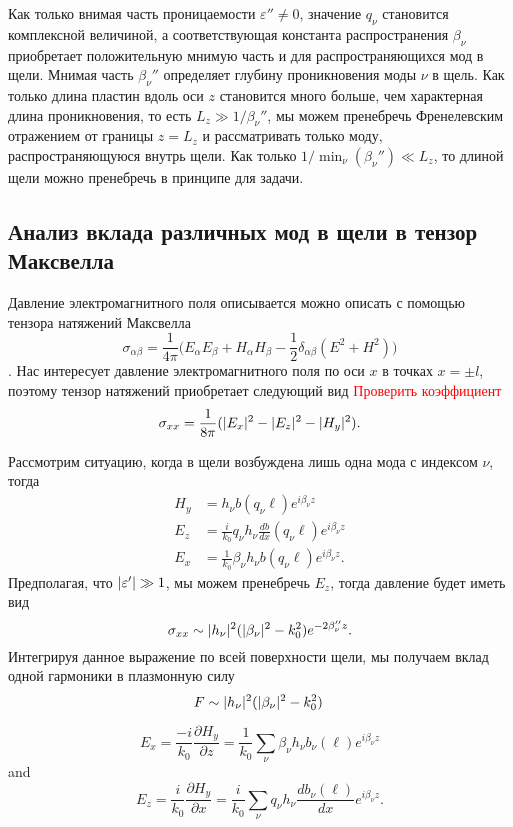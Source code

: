  Как только внимая часть проницаемости $\varepsilon'' \neq 0$, значение $q_\nu$ становится комплексной величиной, а соответствующая константа 
 распространения $\beta_\nu$ приобретает положительную мнимую часть и для распространяющихся мод в щели. Мнимая часть $\beta_\nu''$ определяет
 глубину проникновения моды $\nu$ в щель. Как только длина пластин вдоль оси $z$ становится много больше, чем характерная длина проникновения, то 
 есть $L_z \gg 1/\beta_\nu''$, мы можем пренебречь Френелевским отражением от границы $z = L_z$ и рассматривать только моду, распространяющуюся внутрь щели.  Как только $1/\min_{\nu}(\beta_\nu'') \ll L_z$,
 то длиной щели можно пренебречь в принципе для задачи. 

\subsection{Анализ вклада различных мод в щели в тензор Максвелла}

Давление электромагнитного поля описывается можно описать с помощью тензора натяжений Максвелла \begin{equation*}
    \sigma_{\alpha \beta} = \frac{1}{4 \pi}\Big( E_\alpha E_\beta + H_\alpha H_\beta - \frac{1}{2}\delta_{\alpha \beta}(E^2 + H^2) \Big)
\end{equation*}. Нас интересует давление электромагнитного поля по оси $x$ в точках $x = \pm l$, поэтому тензор натяжений приобретает следующий вид \textcolor{red}{Проверить коэффициент}
\begin{equation}
    \sigma_{xx} = \frac{1}{8 \pi} (\lvert E_x\rvert^2 -\lvert E_z\rvert^2 - \lvert H_y\rvert^2).
\end{equation}

Рассмотрим ситуацию, когда в щели возбуждена лишь одна мода с индексом $\nu$, тогда
\begin{align*}
    H_y &= h_\nu b(q_\nu\ell) e^{i \beta_\nu z}  \\
    E_z &= \frac{i}{k_0} q_\nu h_\nu \frac{db}{dx}(q_\nu\ell) e^{i \beta_\nu z}  \\
    E_x &= \frac{1}{k_0} \beta_\nu h_\nu b(q_\nu\ell) e^{i \beta_\nu z}.
\end{align*}
Предполагая, что $\lvert\varepsilon'\rvert \gg 1$, мы можем пренебречь $E_z$, тогда давление будет иметь вид
\begin{equation}
   \sigma_{xx} \sim \lvert h_\nu\rvert^2(\lvert\beta_\nu\rvert^2 - k_0^2 )e^{-2\beta_\nu'' z}.
\end{equation}
Интегрируя данное выражение по всей поверхности щели, мы получаем вклад одной гармоники в плазмонную силу
\begin{equation}
  F \sim \lvert h_\nu\rvert^2 (\lvert\beta_\nu\rvert^2 - k_0^2)\frac{}{}
\end{equation}
\begin{equation*}
E_x = \frac{-i}{k_0}\frac{\partial H_y}{\partial z} = \frac{1}{k_0}\sum_{\nu}\beta_\nu h_\nu b_\nu(\ell) e^{i \beta_\nu z}
\end{equation*}
and 
\begin{equation*}
E_z = \frac{i}{k_0}\frac{\partial H_y}{\partial x} = \frac{i}{k_0}\sum_{\nu} q_\nu h_\nu  \frac{d b_\nu(\ell)}{d x} e^{i \beta_\nu z}.
\end{equation*}

